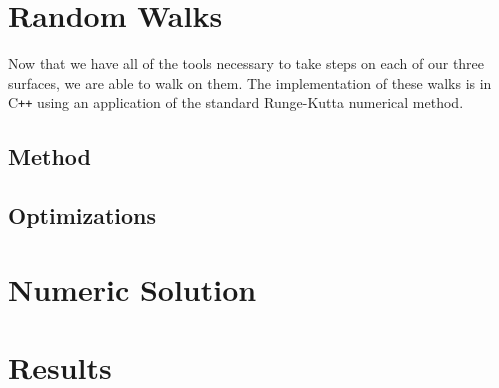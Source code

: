 \documentclass{article}
\begin{document}
\section{Random Walks}
	Now that we have all of the tools necessary to take steps on each of our three surfaces, we are able to walk on them.
	The implementation of these walks is in C\texttt{++} using an application of the standard Runge-Kutta numerical method.
	
	\subsection{Method}
	
	\subsection{Optimizations}

\section{Numeric Solution}

\section{Results}



\end{document}
